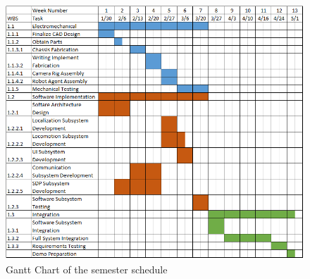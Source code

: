 \begin{figure}[ht!]
 \centering
  \includegraphics[width=0.99\columnwidth]{figures/gantt_chart.png}
  \caption{Gantt Chart of the semester schedule}
 \label{fig:gantt_chart}
\end{figure}
